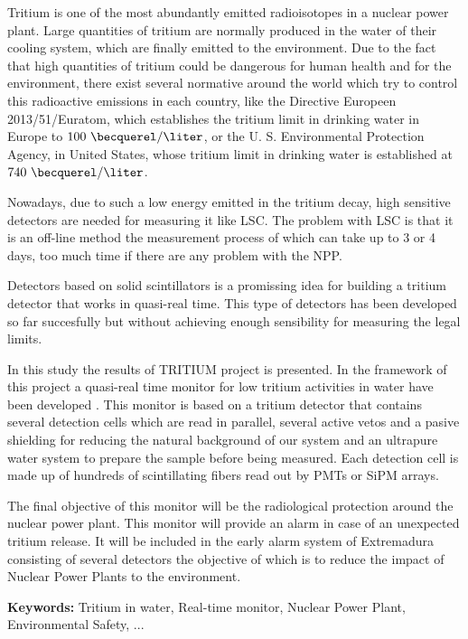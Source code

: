 Tritium is one of the most abundantly emitted radioisotopes in a nuclear power plant. Large quantities of tritium are normally produced in the water of their cooling system, which are finally emitted to the environment. Due to the fact that high quantities of tritium could be dangerous for human health and for the environment, there exist several normative around the world which try to control this radioactive emissions in each country, like the Directive Europeen 2013/51/Euratom, which establishes the tritium limit in drinking water in Europe to $100~\becquerel/\liter$, or the U. S. Environmental Protection Agency, in United States, whose tritium limit in drinking water is established at $740~\becquerel/\liter$.

Nowadays, due to such a low energy emitted in the tritium decay, high sensitive detectors are needed for measuring it like LSC. The problem with LSC is that it is an off-line method the measurement process of which can take up to 3 or 4 days, too much time if there are any problem with the NPP.

Detectors based on solid scintillators is a promissing idea for building a tritium detector that works in quasi-real time. This type of detectors has been developed so far succesfully but without achieving enough sensibility for measuring the legal limits.

In this study the results of TRITIUM project is presented. In the framework of this project a quasi-real time monitor for low tritium activities in water have been developed . This monitor is based on a tritium detector that contains several detection cells which are read in parallel, several active vetos and a pasive shielding for reducing the natural background of our system and an ultrapure water system to prepare the sample before being measured. Each detection cell is made up of hundreds of scintillating fibers read out by PMTs or SiPM arrays.

The final objective of this monitor will be the radiological protection around the nuclear power plant. This monitor will provide an alarm in case of an unexpected tritium release. It will be included in the early alarm system of Extremadura consisting of several detectors the objective of which is to reduce the impact of Nuclear Power Plants to the environment.

\vspace{1cm}

\textbf{Keywords:} Tritium in water, Real-time monitor, Nuclear Power Plant, Environmental Safety, ...